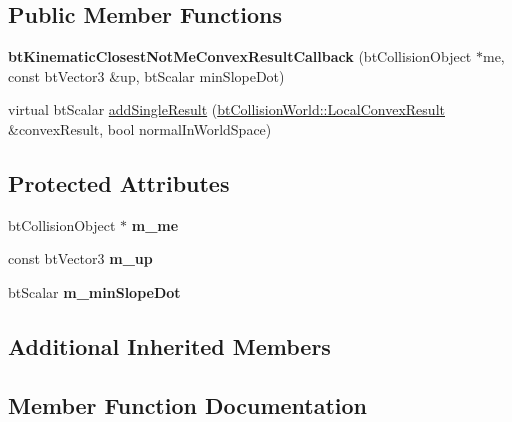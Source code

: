 \subsection*{Public Member Functions}
\begin{DoxyCompactItemize}
\item 
\mbox{\label{classbtKinematicClosestNotMeConvexResultCallback_af3bacb5219f6508a8fa54c2a2358f68c}} 
{\bfseries bt\+Kinematic\+Closest\+Not\+Me\+Convex\+Result\+Callback} (bt\+Collision\+Object $\ast$me, const bt\+Vector3 \&up, bt\+Scalar min\+Slope\+Dot)
\item 
virtual bt\+Scalar \hyperlink{classbtKinematicClosestNotMeConvexResultCallback_a793706b7811ea2d917349ed1501a77a5}{add\+Single\+Result} (\hyperlink{structbtCollisionWorld_1_1LocalConvexResult}{bt\+Collision\+World\+::\+Local\+Convex\+Result} \&convex\+Result, bool normal\+In\+World\+Space)
\end{DoxyCompactItemize}
\subsection*{Protected Attributes}
\begin{DoxyCompactItemize}
\item 
\mbox{\label{classbtKinematicClosestNotMeConvexResultCallback_a7571571d1adef1f11bde7c9e53e67c8d}} 
bt\+Collision\+Object $\ast$ {\bfseries m\+\_\+me}
\item 
\mbox{\label{classbtKinematicClosestNotMeConvexResultCallback_a27cb64c495b0dca9e5254a9f788ced88}} 
const bt\+Vector3 {\bfseries m\+\_\+up}
\item 
\mbox{\label{classbtKinematicClosestNotMeConvexResultCallback_aff708f4951a12e1b4f0e541ded6ee568}} 
bt\+Scalar {\bfseries m\+\_\+min\+Slope\+Dot}
\end{DoxyCompactItemize}
\subsection*{Additional Inherited Members}


\subsection{Member Function Documentation}
\mbox{\label{classbtKinematicClosestNotMeConvexResultCallback_a793706b7811ea2d917349ed1501a77a5}} 
